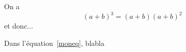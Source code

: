 \documentclass[10pt,a4paper]{article}
\begin{document}
On a
\begin{equation}
(a+b)^3=(a+b)(a+b)^2
\label{moneq}
\end{equation}
et donc...

Dans l'équation~\eqref{moneq}, blabla
\end{document}
